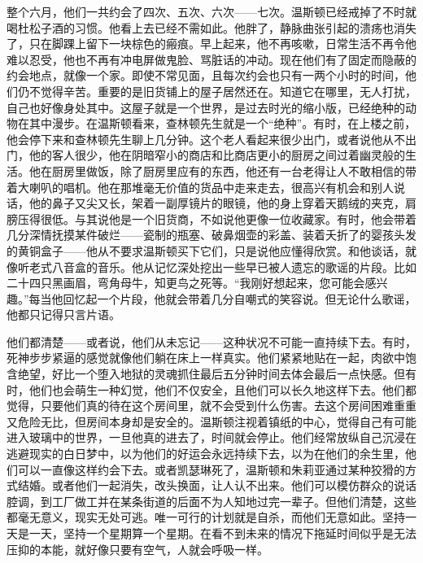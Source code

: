 整个六月，他们一共约会了四次、五次、六次——七次。温斯顿已经戒掉了不时就喝杜松子酒的习惯。他看上去已经不需如此。他胖了，静脉曲张引起的溃疡也消失了，只在脚踝上留下一块棕色的瘢痕。早上起来，他不再咳嗽，日常生活不再令他难以忍受，他也不再有冲电屏做鬼脸、骂脏话的冲动。现在他们有了固定而隐蔽的约会地点，就像一个家。即使不常见面，且每次约会也只有一两个小时的时间，他们仍不觉得辛苦。重要的是旧货铺上的屋子居然还在。知道它在哪里，无人打扰，自己也好像身处其中。这屋子就是一个世界，是过去时光的缩小版，已经绝种的动物在其中漫步。在温斯顿看来，查林顿先生就是一个``绝种''。有时，在上楼之前，他会停下来和查林顿先生聊上几分钟。这个老人看起来很少出门，或者说他从不出门，他的客人很少，他在阴暗窄小的商店和比商店更小的厨房之间过着幽灵般的生活。他在厨房里做饭，除了厨房里应有的东西，他还有一台老得让人不敢相信的带着大喇叭的唱机。他在那堆毫无价值的货品中走来走去，很高兴有机会和别人说话，他的鼻子又尖又长，架着一副厚镜片的眼镜，他的身上穿着天鹅绒的夹克，肩膀压得很低。与其说他是一个旧货商，不如说他更像一位收藏家。有时，他会带着几分深情抚摸某件破烂——瓷制的瓶塞、破鼻烟壶的彩盖、装着夭折了的婴孩头发的黄铜盒子——他从不要求温斯顿买下它们，只是说他应懂得欣赏。和他谈话，就像听老式八音盒的音乐。他从记忆深处挖出一些早已被人遗忘的歌谣的片段。比如二十四只黑画眉，弯角母牛，知更鸟之死等。``我刚好想起来，您可能会感兴趣。''每当他回忆起一个片段，他就会带着几分自嘲式的笑容说。但无论什么歌谣，他都只记得只言片语。

他们都清楚——或者说，他们从未忘记——这种状况不可能一直持续下去。有时，死神步步紧逼的感觉就像他们躺在床上一样真实。他们紧紧地贴在一起，肉欲中饱含绝望，好比一个堕入地狱的灵魂抓住最后五分钟时间去体会最后一点快感。但有时，他们也会萌生一种幻觉，他们不仅安全，且他们可以长久地这样下去。他们都觉得，只要他们真的待在这个房间里，就不会受到什么伤害。去这个房间困难重重又危险无比，但房间本身却是安全的。温斯顿注视着镇纸的中心，觉得自己有可能进入玻璃中的世界，一旦他真的进去了，时间就会停止。他们经常放纵自己沉浸在逃避现实的白日梦中，以为他们的好运会永远持续下去，以为在他们的余生里，他们可以一直像这样约会下去。或者凯瑟琳死了，温斯顿和朱莉亚通过某种狡猾的方式结婚。或者他们一起消失，改头换面，让人认不出来。他们可以模仿群众的说话腔调，到工厂做工并在某条街道的后面不为人知地过完一辈子。但他们清楚，这些都毫无意义，现实无处可逃。唯一可行的计划就是自杀，而他们无意如此。坚持一天是一天，坚持一个星期算一个星期。在看不到未来的情况下拖延时间似乎是无法压抑的本能，就好像只要有空气，人就会呼吸一样。

